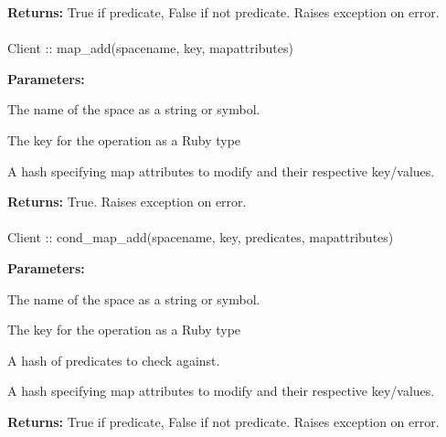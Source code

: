 \noindent\textbf{Returns:}
True if predicate, False if not predicate.  Raises exception on error.

\paragraph{}
\begin{ccode}
Client :: map_add(spacename, key, mapattributes)
\end{ccode}
\funcdesc 

\noindent\textbf{Parameters:}
\begin{description}[labelindent=\widthof{{\code{mapattributes}}},leftmargin=*,noitemsep,nolistsep,align=right]
\item[\code{spacename}] The name of the space as a string or symbol.
\item[\code{key}] The key for the operation as a Ruby type
\item[\code{mapattributes}] A hash specifying map attributes to modify and their respective key/values.
\end{description}

\noindent\textbf{Returns:}
True.  Raises exception on error.

\paragraph{}
\begin{ccode}
Client :: cond_map_add(spacename, key, predicates, mapattributes)
\end{ccode}
\funcdesc 

\noindent\textbf{Parameters:}
\begin{description}[labelindent=\widthof{{\code{mapattributes}}},leftmargin=*,noitemsep,nolistsep,align=right]
\item[\code{spacename}] The name of the space as a string or symbol.
\item[\code{key}] The key for the operation as a Ruby type
\item[\code{predicates}] A hash of predicates to check against.
\item[\code{mapattributes}] A hash specifying map attributes to modify and their respective key/values.
\end{description}

\noindent\textbf{Returns:}
True if predicate, False if not predicate.  Raises exception on error.

